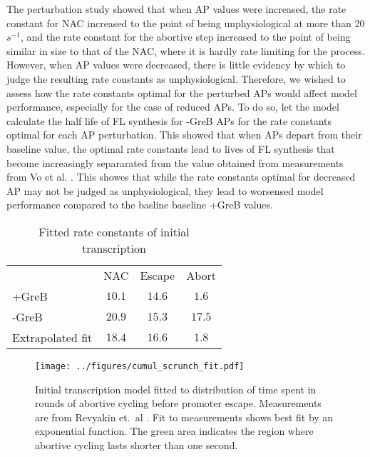 The perturbation study showed that when AP values were increased,  the rate
constant for NAC increased to the point of being unphysiological at more than
20 $s^{-1}$, and the rate constant for the abortive step increased to the
point of being similar in size to that of the NAC, where it is hardly rate
limiting for the process. However, when AP values were decreased, there is
little evidency by which to judge the resulting rate constants as
unphysiological. Therefore, we wished to assess how the rate constants optimal
for the perturbed APs would affect model performance, especially for the case
of reduced APs. To do so, let the model calculate the half life of FL
synthesis for -GreB APs for the rate constants optimal for each AP
perturbation. This showed that when APs depart from their baseline value, the
optimal rate constants lead to lives of FL synthesis that become increasingly
separarated from the value obtained from measurements from Vo et al.
\cite{vo_vitro_2003-1}. This showes that while the rate constants optimal for
decreased AP may not be judged as unphysiological, they lead to worsensed
model performance compared to the basline baseline +GreB values.

\begin{table}
  \label{tab:param_fit_revyakin}
  \caption{Fitted rate constants of initial transcription}
  \begin{center}
    \begin{tabular}{lccc}
       \toprule
       & NAC & Escape & Abort \\
       +GreB & $10.1$ & $14.6$ & $1.6$ \\
       -GreB & $20.9$ & $15.3$ & $17.5$ \\
       Extrapolated fit & $18.4$ & $16.6$ & $1.8$ \\
    \end{tabular}
  \end{center}
\end{table}

\begin{figure}
    \begin{center}
      \texttt{[image: ../figures/cumul\_scrunch\_fit.pdf]}
    \end{center}
    \caption{Initial transcription model fitted to distribution of time spent
      in rounds of abortive cycling before promoter escape. Measurements are
      from Revyakin et.\ al \cite{revyakin_abortive_2006}. Fit to measurements
      shows best fit by an exponential function. The green area indicates the
      region where abortive cycling lasts shorter than one second.}
\label{fig:revyakin_fit}
\end{figure}


